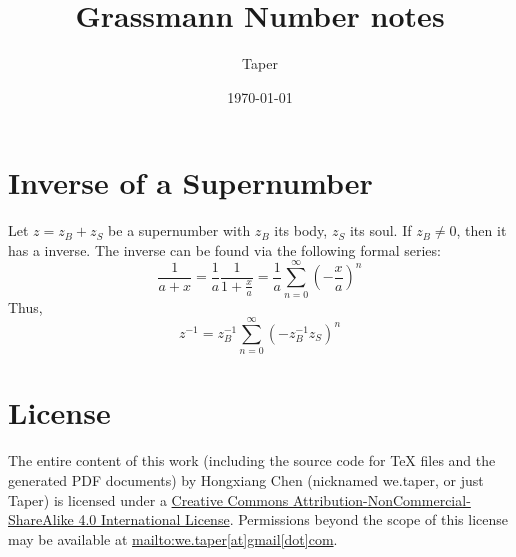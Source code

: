\documentclass{article}
\title{Grassmann Number notes}
\date{\today}
\author{Taper}
\begin{document}
\maketitle
{}
\tableofcontents

\section{Inverse of a Supernumber}

Let $z=z_B + z_S$ be a supernumber with $z_B$ its body, $z_S$ its soul.
If $z_B\neq 0$, then it has a inverse. The inverse can be found via the
following formal series:
\begin{equation}
    \frac{1}{a+x} = \frac{1}{a}\frac{1}{1+\frac{x}{a}} =
    \frac{1}{a}\sum_{n=0}^{\infty}(-\frac{x}{a})^n
\end{equation}
Thus,
\begin{equation}
    z^{-1} = z_B^{-1}\sum_{n=0}^{\infty} (-z_B^{-1}z_S)^n
\end{equation}
{}

\printnomenclature
\section{License}
The entire content of this work (including the source code
for TeX files and the generated PDF documents) by 
Hongxiang Chen (nicknamed we.taper, or just Taper) is
licensed under a 
\href{http://creativecommons.org/licenses/by-nc-sa/4.0/}{Creative 
Commons Attribution-NonCommercial-ShareAlike 4.0 International 
License}. Permissions beyond the scope of this 
license may be available at \url{mailto:we.taper[at]gmail[dot]com}.
\end{document}
